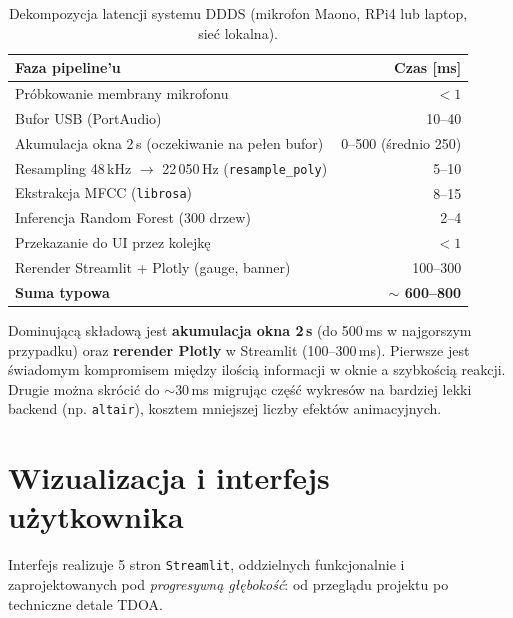 \documentclass[11pt,a4paper]{article}
\begin{document}
\begin{table}[H]
\centering
\caption{Dekompozycja latencji systemu DDDS (mikrofon Maono, RPi4 lub
laptop, sieć lokalna).}
\label{tab:latency}
\begin{tabular}{lr}
\toprule
\textbf{Faza pipeline'u}                                  & \textbf{Czas [ms]} \\
\midrule
Próbkowanie membrany mikrofonu                            & $< 1$ \\
Bufor USB (PortAudio)                                     & 10--40 \\
Akumulacja okna 2\,s (oczekiwanie na pełen bufor)         & 0--500 (średnio 250) \\
Resampling 48\,kHz $\to$ 22\,050\,Hz (\texttt{resample\_poly}) & 5--10 \\
Ekstrakcja MFCC (\texttt{librosa})                        & 8--15 \\
Inferencja Random Forest (300 drzew)                      & 2--4 \\
Przekazanie do UI przez kolejkę                           & $< 1$ \\
Rerender Streamlit + Plotly (gauge, banner)               & 100--300 \\
\midrule
\textbf{Suma typowa}                                      & \textbf{$\sim$ 600--800} \\
\bottomrule
\end{tabular}
\end{table}

Dominującą składową jest \textbf{akumulacja okna 2\,s} (do 500\,ms w
najgorszym przypadku) oraz \textbf{rerender Plotly} w Streamlit (100--300\,ms).
Pierwsze jest świadomym kompromisem między ilością informacji w oknie a
szybkością reakcji. Drugie można skrócić do $\sim 30$\,ms migrując część
wykresów na bardziej lekki backend (np. \texttt{altair}), kosztem mniejszej
liczby efektów animacyjnych.

\section{Wizualizacja i interfejs użytkownika}
\label{sec:ui}

Interfejs realizuje 5 stron \texttt{Streamlit}, oddzielnych funkcjonalnie i
zaprojektowanych pod \emph{progresywną głębokość}: od przeglądu projektu po
techniczne detale TDOA.
\end{document}
